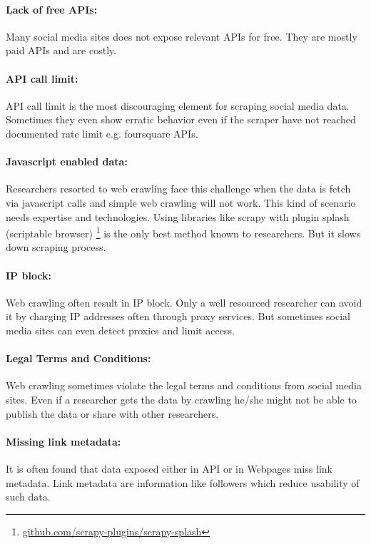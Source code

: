 \paragraph{Lack of free APIs:} Many social media sites does not expose relevant APIs for free. They are mostly paid APIs and are costly.

\paragraph{API call limit:} API call limit is the most discouraging element for scraping social media data. Sometimes they even show erratic behavior even if the scraper have not reached documented rate limit e.g. foursquare APIs.

\paragraph{Javascript enabled data:}
Researchers resorted to web crawling face this challenge when the data is fetch via javascript calls and simple web crawling will not work. This kind of scenario needs expertise and technologies. Using libraries like scrapy with plugin splash (scriptable browser) \footnote{\href{https://github.com/scrapy-plugins/scrapy-splash}{github.com/scrapy-plugins/scrapy-splash}} is the only best method known to researchers. But it slows down scraping process.

\paragraph{IP block:}
Web crawling often result in IP block. Only a well resourced researcher can avoid it by charging IP addresses often through proxy services. But sometimes social media sites can even detect proxies and limit access.

\paragraph{Legal Terms and Conditions:}
Web crawling sometimes violate the legal terms and conditions from social media sites. Even if a researcher gets the data by crawling he/she might not be able to publish the data or share with other researchers.

\paragraph{Missing link metadata: }
It is often found that data exposed either in API or in Webpages miss link metadata. Link metadata are information like followers which reduce usability of such data.

